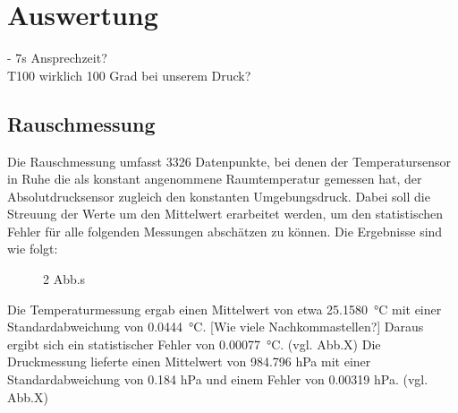 \documentclass[]{article}
\begin{document}
\section{Auswertung}
{\color{red}- 7s Ansprechzeit?}\\
{\color{red}T100 wirklich 100 Grad bei unserem Druck?}\\
\subsection{Rauschmessung}
Die Rauschmessung umfasst 3326 Datenpunkte, bei denen der Temperatursensor in Ruhe die als konstant angenommene Raumtemperatur gemessen hat, der Absolutdrucksensor zugleich den konstanten Umgebungsdruck. Dabei soll die Streuung der Werte um den Mittelwert erarbeitet werden, um den statistischen Fehler für alle folgenden Messungen abschätzen zu können.
Die Ergebnisse sind wie folgt:
\begin{figure}
	2 Abb.s
\end{figure}
Die Temperaturmessung ergab einen Mittelwert von etwa \SI{25.1580}{\celsius} mit einer Standardabweichung von \SI{0.0444}{\celsius}. {\color{red}[Wie viele Nachkommastellen?]} Daraus ergibt sich ein statistischer Fehler von \SI{0.00077}{\celsius}. {\color{red}(vgl. Abb.X)}
Die Druckmessung lieferte einen Mittelwert von 984.796 hPa mit einer Standardabweichung von 0.184 hPa und einem Fehler von 0.00319 hPa. {\color{red}(vgl. Abb.X)}
\end{document}
